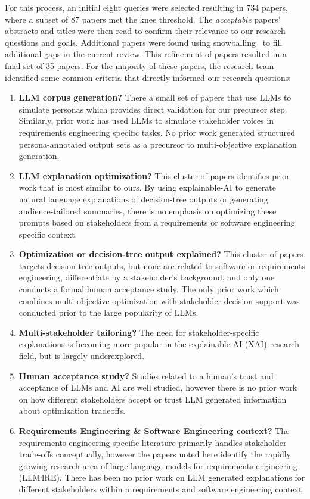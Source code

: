 \documentclass[sigconf,review]{acmart}
\begin{document}
For this process, an initial eight queries were selected resulting in 734 papers, where a subset of 87 papers met the knee threshold. The \textit{acceptable} papers' abstracts and titles were then read to confirm their relevance to our research questions and goals. Additional papers were found using snowballing~\cite{jalali2012systematic} to fill additional gaps in the current review. This refinement of papers resulted in a final set of 35 papers. For the majority of these papers, the research team identified some common criteria that directly informed our research questions:

\begin{enumerate}
    \item \textbf{LLM corpus generation?} There a small set of papers that use LLMs to simulate personas which provides direct validation for our precursor step. Similarly, prior work has used LLMs to simulate stakeholder voices in requirements engineering specific tasks. No prior work generated structured persona-annotated output sets as a precursor to multi-objective explanation generation.
    \item \textbf{LLM explanation optimization?} This cluster of papers identifies prior work that is most similar to ours. By using explainable-AI to generate natural language explanations of decision-tree outputs or generating audience-tailored summaries, there is no emphasis on optimizing these prompts based on stakeholders from a requirements or software engineering specific context.
    \item \textbf{Optimization or decision-tree output explained?} This cluster of papers targets decision-tree outputs, but none are related to software or requirements engineering, differentiate by a stakeholder's background, and only one conducts a formal human acceptance study. The only prior work which combines multi-objective optimization with stakeholder decision support was conducted prior to the large popularity of LLMs.
    \item \textbf{Multi-stakeholder tailoring?} The need for stakeholder-specific explanations is becoming more popular in the explainable-AI (XAI) research field, but is largely underexplored. 
    \item \textbf{Human acceptance study?}  Studies related to a human's trust and acceptance of LLMs and AI are well studied, however there is no prior work on how different stakeholders accept or trust LLM generated information about optimization tradeoffs.
    \item \textbf{Requirements Engineering \& Software Engineering context?} The requirements engineering-specific literature primarily handles stakeholder trade-offs conceptually, however the papers noted here identify the rapidly growing research area of large language models for requirements engineering (LLM4RE). There has been no prior work on LLM generated explanations for different stakeholders within a requirements and software engineering context.
\end{enumerate}
\end{document}
